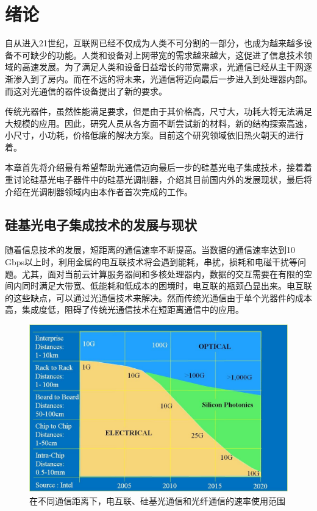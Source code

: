\chapter{绪论}
自从进入21世纪，互联网已经不仅成为人类不可分割的一部分，也成为越来越多设备不可缺少的功能。人类和设备对上网带宽的需求越来越大，这促进了信息技术领域的高速发展。为了满足人类和设备日益增长的带宽需求，光通信已经从主干网逐渐渗入到了房内。而在不远的将未来，光通信将迈向最后一步进入到处理器内部。而这对光通信的器件设备提出了新的要求。


传统光器件，虽然性能满足要求，但是由于其价格高，尺寸大，功耗大将无法满足大规模的应用。因此，研究人员从各方面不断尝试新的材料，新的结构探索高速，小尺寸，小功耗，价格低廉的解决方案。目前这个研究领域依旧热火朝天的进行着。


本章首先将介绍最有希望帮助光通信迈向最后一步的硅基光电子集成技术，接着着重讨论硅基光电子器件中的硅基光调制器，介绍其目前国内外的发展现状，最后将介绍在光调制器领域内由本作者首次完成的工作。


\section{硅基光电子集成技术的发展与现状}
随着信息技术的发展，短距离的通信速率不断提高。当数据的通信速率达到10 Gbps以上时，利用金属的电互联技术将会遇到能耗，串扰，损耗和电磁干扰等问题。尤其，面对当前云计算服务器间和多核处理器内，数据的交互需要在有限的空间内同时满足大带宽、低能耗和低成本的困境时，电互联的瓶颈凸显出来。电互联的这些缺点，可以通过光通信技术来解决。然而传统光通信由于单个光器件的成本高，集成度低，阻碍了传统光通信技术在短距离通信中的应用。

\begin{figure}[htb]
	\centering
	\includegraphics[width=12cm]{./Pictures/figure1.jpg}
	\caption{在不同通信距离下，电互联、硅基光通信和光纤通信的速率使用范围 \cite{Zuffada2012}}
	\label{figure1}
\end{figure}

